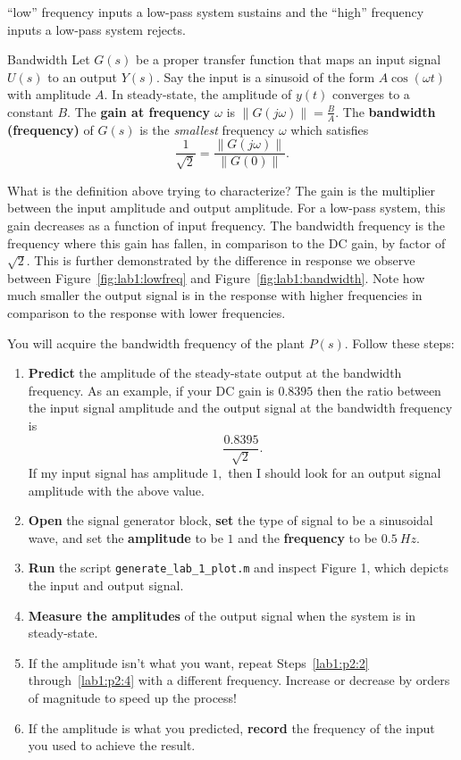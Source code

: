 ``low'' frequency inputs a low-pass system sustains and the ``high'' frequency
inputs a low-pass system rejects.
%
\begin{definition}[]{Bandwidth}
  Let \(G(s)\) be a proper transfer function
  that maps an input signal \(U(s)\) to an output \(Y(s).\)
%
  Say the input is a sinusoid of the form \(A \cos(\omega t)\) with amplitude
  \(A.\) In steady-state, the amplitude of \(y(t)\) converges to a constant
  \(B.\) The \textbf{gain at frequency \(\omega\)} is
  \(\left\|G(j\omega)\right\| = \frac{B}{A}.\)
%
  The \textbf{bandwidth (frequency)} of \(G(s)\) is the \emph{smallest}
  frequency \(\omega\) which satisfies
  \[
    \frac{1}{\sqrt{2}} = \frac{\left\|G(j\omega)\right\|}{\left\|G(0)\right\|}.
  \]
\end{definition}
%
What is the definition above trying to characterize? The
gain is the multiplier between the input amplitude and output amplitude. For
a low-pass system, this gain decreases as a function of input frequency. The
bandwidth frequency is the frequency where this gain has fallen, in comparison
to the DC gain, by factor of \(\sqrt{2}.\) This is further demonstrated
by the difference in response we observe between Figure~\ref{fig:lab1:lowfreq}
and Figure~\ref{fig:lab1:bandwidth}. Note how much smaller the output signal
is in the response with higher frequencies in comparison to the response
with lower frequencies.
%
\begin{procedure}[label={proc:lab1:p2}]
  You will acquire the bandwidth frequency of the plant \(P(s)\).
  Follow these steps:
  \begin{enumerate}[label=(\arabic*)]
    \item{
      \textbf{Predict} the amplitude of the steady-state output at the
      bandwidth frequency. As an example, if your DC gain is \(0.8395\) then
      the ratio between the input signal amplitude and the output signal
      at the bandwidth frequency is
      \[
        \frac{0.8395}{\sqrt{2}}.
      \]
      If my input signal has amplitude \(1,\) then I should look for
      an output signal amplitude with the above value.
    }
    \item{
      \textbf{Open} the signal generator block, \textbf{set} the type of signal
      to be a sinusoidal wave, and set the
      \textbf{amplitude} to be \(1\) and
      the \textbf{frequency} to be \(\SI{0.5}{Hz}.\)
      \label{lab1:p2:2}
    }
    \item{
      \textbf{Run} the script \texttt{generate\_lab\_1\_plot.m} and inspect
      Figure 1, which depicts the input and output signal.
    }
    \item{
      \textbf{Measure the amplitudes} of the output signal
      when the system is in steady-state.
      \label{lab1:p2:4}
    }
    \item{
      If the amplitude isn't what you want, repeat Steps~\ref{lab1:p2:2} through~\ref{lab1:p2:4} with a different frequency. Increase or decrease
      by orders of magnitude to speed up the process!
    }
    \item{
      If the amplitude is what you predicted, \textbf{record} the frequency
      of the input you used to achieve the result.
    }
  \end{enumerate}
\end{procedure}

